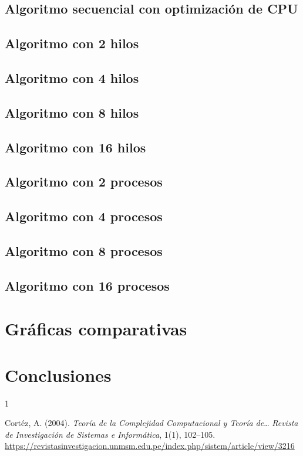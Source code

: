 \documentclass[12pt, letterpaper]{article}
\begin{document}
\subsection{Algoritmo secuencial con optimización de CPU}

\subsection{Algoritmo con 2 hilos}

\subsection{Algoritmo con 4 hilos}

\subsection{Algoritmo con 8 hilos}

\subsection{Algoritmo con 16 hilos}

\subsection{Algoritmo con 2 procesos}

\subsection{Algoritmo con 4 procesos}

\subsection{Algoritmo con 8 procesos}

\subsection{Algoritmo con 16 procesos}
\newpage

\section{Gráficas comparativas}
\newpage

\section{Conclusiones}
\newpage

\begin{thebibliography}{1}

Cortéz, A. (2004).
\textit{Teoría de la Complejidad Computacional y Teoría de}…
\textit{Revista de Investigación de Sistemas e Informática}, 1(1), 102--105.
\url{https://revistasinvestigacion.unmsm.edu.pe/index.php/sistem/article/view/3216}

\end{thebibliography}
\end{document}
